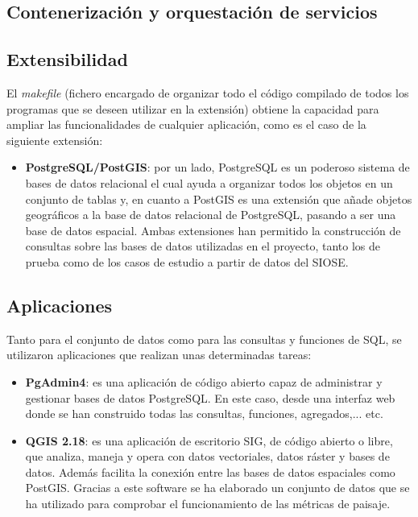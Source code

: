 \subsection{Contenerización y orquestación de servicios}

\subsection{Extensibilidad}
El \textit{makefile} (fichero encargado de organizar todo el código compilado de todos los programas que se deseen utilizar en la extensión) obtiene la capacidad para ampliar las funcionalidades de cualquier aplicación, como es el caso de la siguiente extensión:
\begin{itemize}
\item\textbf{PostgreSQL/PostGIS}: por un lado, PostgreSQL es un poderoso sistema de bases de datos relacional el cual ayuda a organizar todos los objetos en un conjunto de tablas y, en cuanto a PostGIS es una extensión que añade objetos geográficos a la base de datos relacional de PostgreSQL, pasando a ser una base de datos espacial. Ambas extensiones han permitido la construcción de consultas sobre las bases de datos utilizadas en el proyecto, tanto los de prueba como de los casos de estudio a partir de datos del SIOSE.
\end{itemize}

\subsection{Aplicaciones}
Tanto para el conjunto de datos como para las consultas y funciones de SQL, se utilizaron aplicaciones que realizan unas determinadas tareas:
\begin{itemize}
\item\textbf{PgAdmin4}: es una aplicación de código abierto capaz de administrar y gestionar bases de datos PostgreSQL. En este caso, desde una interfaz web donde se han construido todas las consultas, funciones, agregados,... etc.
\item\textbf{QGIS 2.18}: es una aplicación de escritorio SIG, de código abierto o libre, que analiza, maneja y opera con datos vectoriales, datos ráster y bases de datos. Además facilita la conexión entre las bases de datos espaciales como PostGIS. Gracias a este software se ha elaborado un conjunto de datos que se ha utilizado para comprobar el funcionamiento de las métricas de paisaje.
\end{itemize}

